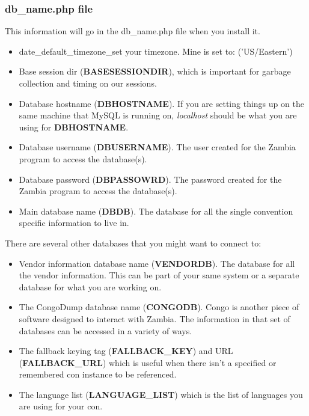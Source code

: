 \documentclass[captions=tablesignature]{scrartcl}
\begin{document}
\subsubsection{db\_name.php file}
\label{sec-1-2-3}
This information will go in the db\_name.php file when you install it.
\begin{itemize}
\item date\_default\_timezone\_set your timezone.  Mine is set to:
('US/Eastern')
\item Base session dir (\textbf{BASESESSIONDIR}), which is important for
garbage collection and timing on our sessions.
\item Database hostname (\textbf{DBHOSTNAME}). If you are setting things up on
the same machine that MySQL is running on, \emph{localhost} should be
what you are using for \textbf{DBHOSTNAME}.
\item Database username (\textbf{DBUSERNAME}).  The user created for the
Zambia program to access the database(s).
\item Database password (\textbf{DBPASSOWRD}).  The password created for the
Zambia program to access the database(s).
\item Main database name (\textbf{DBDB}).  The database for all the single
convention specific information to live in.
\end{itemize}
There are several other databases that you might want to connect to:
\begin{itemize}
\item Vendor information database name (\textbf{VENDORDB}).  The database
for all the vendor information.  This can be part of your same
system or a separate database for what you are working on.
\item The CongoDump database name (\textbf{CONGODB}). Congo is another piece of
software designed to interact with Zambia. The information in
that set of databases can be accessed in a variety of ways.
\item The fallback keying tag (\textbf{FALLBACK\_KEY}) and URL
(\textbf{FALLBACK\_URL}) which is useful when there isn't a specified
or remembered con instance to be referenced.
\item The language list (\textbf{LANGUAGE\_LIST}) which is the list of
languages you are using for your con.
\end{itemize}
\end{document}
